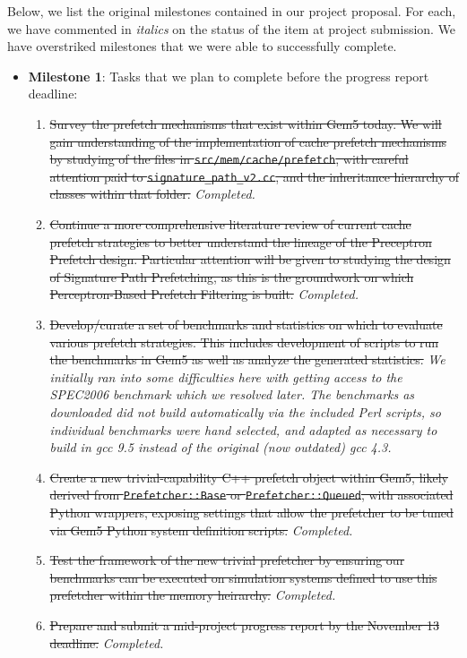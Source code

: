 \documentclass[10pt,conference]{IEEEtran}
\begin{document}
Below, we list the original milestones contained in our project proposal. For each, we have commented in \textit{italics} on the status of the item at project submission. We have overstriked milestones that we were able to successfully complete.
\begin{itemize}
\item\textbf{Milestone 1}: Tasks that we plan to complete before the progress report deadline:
  \begin{enumerate}
    \item \sout{Survey the prefetch mechanisms that exist within Gem5 today. We will gain understanding of the implementation of cache prefetch mechanisms by studying of the files in \texttt{src/mem/cache/prefetch}, with careful attention paid to \texttt{signature\_path\_v2.cc}, and the inheritance hierarchy of classes within that folder.} \textit{Completed.}
    \item \sout{Continue a more comprehensive literature review of current cache prefetch strategies to better understand the lineage of the Preceptron Prefetch design. Particular attention will be given to studying the design of Signature Path Prefetching, as this is the groundwork on which Perceptron-Based Prefetch Filtering is built.} \textit{Completed.}
    \item \sout{Develop/curate a set of benchmarks and statistics on which to evaluate various prefetch strategies. This includes development of scripts to run the benchmarks in Gem5 as well as analyze the generated statistics.} \textit{We initially ran into some difficulties here with getting access to the SPEC2006 benchmark which we resolved later. The benchmarks as downloaded did not build automatically via the included Perl scripts, so individual benchmarks were hand selected, and adapted as necessary to build in gcc 9.5 instead of the original (now outdated) gcc 4.3.}
    \item \sout{Create a new trivial-capability C++ prefetch object within Gem5, likely derived from \texttt{Prefetcher::Base} or \texttt{Prefetcher::Queued}, with associated Python wrappers, exposing settings that allow the prefetcher to be tuned via Gem5 Python system definition scripts.} \textit{Completed.}
    \item \sout{Test the framework of the new trivial prefetcher by ensuring our benchmarks can be executed on simulation systems defined to use this prefetcher within the memory heirarchy.} \textit{Completed.}
    \item \sout{Prepare and submit a mid-project progress report by the November 13 deadline.} \textit{Completed.}

\end{enumerate}
\end{itemize}
\end{document}
